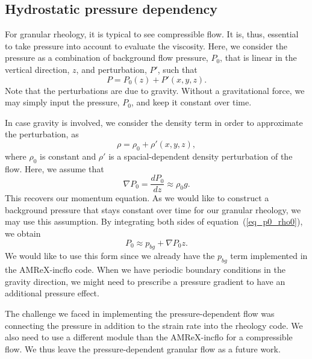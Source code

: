 \subsection{Hydrostatic pressure dependency}
For granular rheology, it is typical to see compressible flow. It is, thus, essential to take pressure into account to evaluate the viscosity.
Here, we consider the pressure as a combination of background flow pressure, $P_0$, that is linear in the vertical direction, $z$, and perturbation, $P'$, such that
\[
P = P_0(z) + P'(x,y,z).\]
Note that the perturbations are due to gravity. Without a gravitational force, we may simply input the pressure, $P_0$, and keep it constant over time.
\par
In case gravity is involved, we consider the density term in order to approximate the perturbation, as 
\[
\rho  = \rho_0  + \rho'(x,y,z), 
\]
where $\rho_0$ is constant and $\rho'$ is a spacial-dependent density perturbation of the flow. 
Here, we assume that 
\begin{equation}
    \nabla P_0  = \frac{d P_0}{d z} \approx \rho_0  g.  
\label{eq_p0_rho0}
\end{equation}
This recovers our momentum equation. As we would like to construct a background pressure that stays constant over time for our granular rheology, we may use this assumption.
By integrating both sides of equation~(\ref{eq_p0_rho0}), we obtain
\begin{equation}
    P_0 \approx p_{bg} + \nabla P_0 z.
\end{equation}
We would like to use this form since we already have the $p_{bg}$ term implemented in the AMReX-incflo code.
%
When we have periodic boundary conditions in the gravity direction, we might need to prescribe a pressure gradient to have an additional pressure effect. 
\par
The challenge we faced in implementing the pressure-dependent flow was connecting the pressure in addition to the strain rate into the rheology code. 
We also need to use a different module than the AMReX-incflo for a compressible flow.
We thus leave the pressure-dependent granular flow as a future work.

